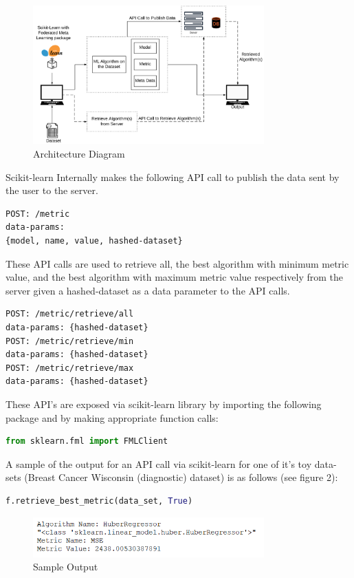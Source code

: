 \documentclass{article}
\begin{document}
\begin{figure}[ht]
    \centering
    \includegraphics[width=3.5in]{architecture-diagram.PNG}
    \caption{Architecture Diagram}
    \label{architecture-diagram}
\end{figure}

Scikit-learn Internally makes the following API call to publish the data sent by the user to the server.
\begin{lstlisting}
POST: /metric
data-params: 
{model, name, value, hashed-dataset}
\end{lstlisting}

These API calls are used to retrieve all, the best algorithm with minimum metric value, and the best algorithm with maximum metric value respectively from the server given a hashed-dataset as a data parameter to the API calls.
\begin{lstlisting}
POST: /metric/retrieve/all
data-params: {hashed-dataset}
POST: /metric/retrieve/min
data-params: {hashed-dataset}
POST: /metric/retrieve/max
data-params: {hashed-dataset}
\end{lstlisting}

These API's are exposed via scikit-learn library by importing the following package and by making appropriate function calls:
\begin{lstlisting}[language=python]
from sklearn.fml import FMLClient
\end{lstlisting}

A sample of the output for an API call via scikit-learn for one of it's toy data-sets (Breast Cancer Wisconsin (diagnostic) dataset) \cite{william-et-al} is as follows (see figure 2):
\begin{lstlisting}[language=python]
f.retrieve_best_metric(data_set, True)
\end{lstlisting}
\begin{figure}[ht]
    \centering
    \includegraphics[width=3.5in]{sample-output.PNG}
    \caption{Sample Output}
    \label{sample-output}
\end{figure}
\end{document}
